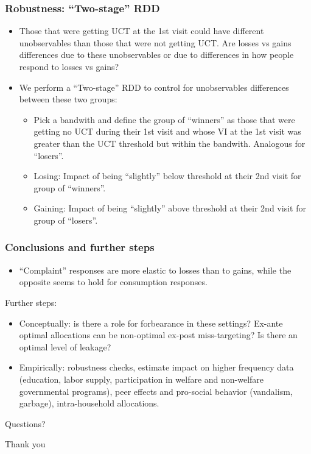 \documentclass{beamer}
\begin{document}
\begin{frame}
\frametitle{Robustness: ``Two-stage'' RDD}
\begin{itemize}
	\item Those that were getting UCT at the 1st visit could have different unobservables than those that were not getting UCT. Are losses vs gains differences due to these unobservables or due to differences in how people respond to losses vs gains?
	\item We perform a ``Two-stage'' RDD to control for unobservables differences between these two groups:
	\begin{itemize}
		\item Pick a bandwith and define the group of ``winners'' as those that were getting no UCT during their 1st visit and whose VI at the 1st visit was greater than the UCT threshold but within the bandwith. Analogous for ``losers''.
		\item Losing: Impact of being ``slightly'' below threshold at their 2nd visit for group of ``winners''.
		\item Gaining: Impact of being ``slightly'' above threshold at their 2nd visit for group of ``losers''.   
	\end{itemize}
\end{itemize}
\end{frame}

\begin{frame}
\frametitle{Conclusions and further steps}
\begin{itemize}
	\item ``Complaint'' responses are more elastic to losses than to gains, while the opposite seems to hold for consumption responses.
\end{itemize}
Further steps:
\begin{itemize}
	\item Conceptually: is there a role for forbearance in these settings? Ex-ante optimal allocations can be non-optimal ex-post miss-targeting? Is there an optimal level of leakage?
	\item Empirically: robustness checks, estimate impact on higher frequency data (education, labor supply, participation in welfare and non-welfare governmental programs), peer effects and pro-social behavior (vandalism, garbage), intra-household allocations.
\end{itemize}

\end{frame}

\begin{frame}
\begin{center}
	{\Huge Questions?\par}
\end{center}
\end{frame}

\begin{frame}
\begin{center}
	{\Huge Thank you\par}
\end{center}
\end{frame}
\end{document}
